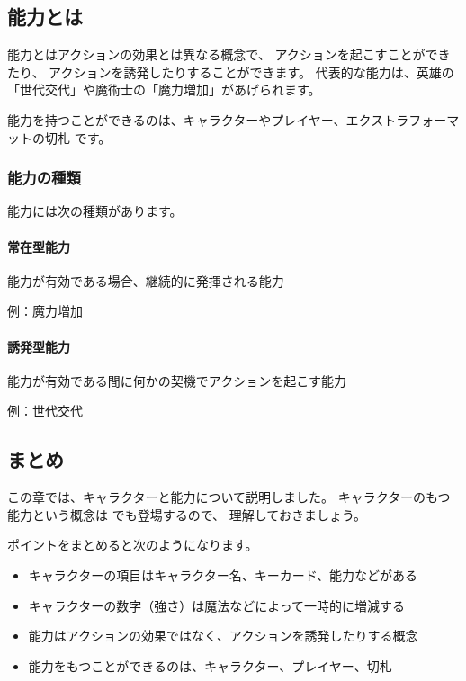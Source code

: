 \documentclass[letterpaper,10pt,dvipdfmx]{sphinxmanual}
\begin{document}
\subsection{能力とは}
\label{\detokenize{common/04-character:abi}}\label{\detokenize{common/04-character:id5}}
能力とはアクションの効果とは異なる概念で、
アクションを起こすことができたり、
アクションを誘発したりすることができます。
代表的な能力は、英雄の「世代交代」や魔術士の「魔力増加」があげられます。

能力を持つことができるのは、キャラクターやプレイヤー、エクストラフォーマットの切札
です。


\subsubsection{能力の種類}
\label{\detokenize{common/04-character:id6}}
能力には次の種類があります。


\paragraph{常在型能力}
\label{\detokenize{common/04-character:id7}}
能力が有効である場合、継続的に発揮される能力

例：魔力増加


\paragraph{誘発型能力}
\label{\detokenize{common/04-character:id8}}
能力が有効である間に何かの契機でアクションを起こす能力

例：世代交代


\subsection{まとめ}
\label{\detokenize{common/04-character:id9}}
この章では、キャラクターと能力について説明しました。
キャラクターのもつ能力という概念は {\hyperref[\detokenize{common/05-action_detail::doc}]{}} でも登場するので、
理解しておきましょう。

ポイントをまとめると次のようになります。
\begin{itemize}
\item {} 
キャラクターの項目はキャラクター名、キーカード、能力などがある

\item {} 
キャラクターの数字（強さ）は魔法などによって一時的に増減する

\item {} 
能力はアクションの効果ではなく、アクションを誘発したりする概念

\item {} 
能力をもつことができるのは、キャラクター、プレイヤー、切札

\end{itemize}
\end{document}
